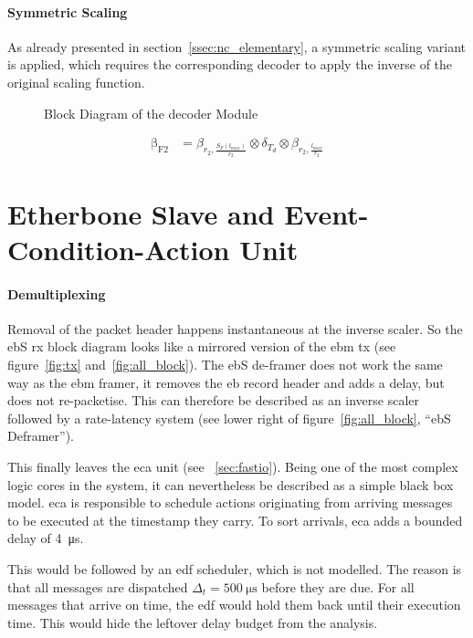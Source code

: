 \paragraph{Symmetric Scaling}
As already presented in section~\ref{ssec:nc_elementary}, a symmetric scaling variant is applied, which requires the
corresponding decoder to apply the inverse of the original scaling function.
\begin{figure}[H]
  \centering
  \def\svgwidth{0.6875\textwidth}
  
  \caption{Block Diagram of the decoder Module}
  \label{fig:dfec}
\end{figure}
%
\begin{align}
\mathrm{\beta_{F2}} &= \beta_{r_2,\frac{S_F\left(l_{max}\right)}{r_2}} \otimes \delta_{T_d} \otimes \beta_{r_2,\frac{l_{max}}{r_2}}
\label{eq:delay_p_framer}
\end{align}
%

\section{Etherbone Slave and Event-Condition-Action Unit}

\paragraph{Demultiplexing}
Removal of the packet header happens instantaneous at the inverse scaler.
So the \gls{eb}S \gls{rx} block diagram looks like a mirrored version of the \gls{ebm} \gls{tx} (see figure~\ref{fig:tx} and~\ref{fig:all_block}).
The \gls{eb}S de-framer does not work the same way as the \gls{ebm} framer, it removes the \gls{eb} record header and adds a delay, but does not re-packetise.
This can therefore be described as an inverse scaler followed by a rate-latency system (see lower right of figure~\ref{fig:all_block}, \enquote{\gls{eb}S Deframer}).
\par
This finally leaves the \gls{eca} unit (see ~\ref{sec:fastio}). Being one of the most complex logic cores in the system, it can nevertheless be described as a simple black box model.
\gls{eca} is responsible to schedule actions originating from arriving messages to be executed at the timestamp they carry. To sort
arrivals, \gls{eca} adds a bounded delay of \SI{4}{\micro\second}.
\par
This would be followed by an \gls{edf} scheduler, which is not modelled. The reason is that all messages are dispatched $\Delta_t = \SI{500}{\micro\second}$ before they are due. 
For all messages that arrive on time, the \gls{edf} would hold them back until their execution time. This would hide the leftover delay budget from the analysis. 

